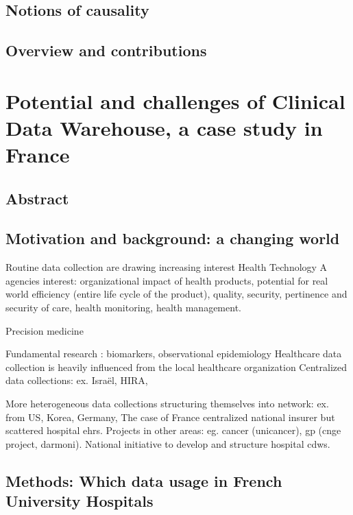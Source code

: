\documentclass{report}
\begin{document}
\section{Notions of causality}\label{sec:intro:causality}




\section{Overview and contributions}\label{sec:intro:contributions}



\chapter{Potential and challenges of Clinical Data Warehouse, a case study in France}\label{chapter:cdw}

\section{Abstract}\label{sec:cdw:abstract}
\section{Motivation and background: a changing world}\label{sec:cdw:motivation}

Routine data collection are drawing increasing interest
Health Technology A agencies interest: organizational impact of health products, potential for real world efficiency (entire life cycle of the product), quality, security, pertinence and security of care, health monitoring, health management.

Precision medicine

Fundamental research : biomarkers, observational epidemiology
Healthcare data collection is heavily influenced from the local healthcare organization
Centralized data collections: ex. Israël, HIRA,

More heterogeneous data collections structuring themselves into network: ex. from US, Korea, Germany,
The case of France
centralized national insurer but scattered hospital ehrs. Projects in other areas: eg. cancer (unicancer), gp (cnge project, darmoni). National initiative to develop and structure hospital cdws.


\section{Methods: Which data usage in French University Hospitals}\label{sec:cdw:motivation}
\end{document}
